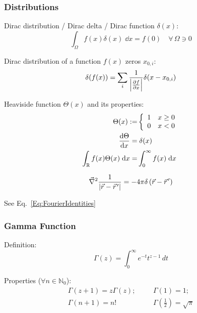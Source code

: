 		\subsubsection{Distributions}
			\noindent
			Dirac distribution / Dirac delta / Dirac function $\delta(x)$:
			\begin{equation}
				\int_\Omega f(x)\delta(x)\;\dd x = f(0)\quad\forall\, \Omega\ni 0
			\end{equation}

			\noindent
			Dirac distribution of a function $f(x)$ zeros $x_{0,i}$:
			\begin{equation}
				\delta(f(x)) = \sum_i \frac{1}{\abs{\pdv{f}{x}(x_{0,i})}}\delta(x-x_{0,i})
			\end{equation}

			\noindent
			Heaviside function $\Theta(x)$ and its properties:
			\begin{equation}
				\begin{aligned}
					\Theta(x) :=& \left\{\begin{array}{ll}
						1 & x\ge 0 \\
						0 & x<0 \\
						\end{array}\right. \\
						\dv{\Theta}{x}(x) =&\; \delta(x) \\
					\int_{\mathbb{R}} f(x)\Theta(x)\;\dd x =& \int_{0}^{\infty} f(x)\;\dd x
				\end{aligned}
			\end{equation}

			\begin{equation}
				\Nabla^2\frac{1}{\abs{\vec{r} - \pvec{r}'}} = -4\pi\delta\left(\vec{r} - \pvec{r}'\right)
			\end{equation}

			\noindent
			See Eq.~\ref{Eq:FourierIdentities}

		\subsubsection{Gamma Function}
			\noindent
			Definition:
			\begin{equation}
				\Gamma(z)=\int_0^{\infty}e^{-t}t^{z-1}\,dt
			\end{equation}

			\noindent
			Properties ($\forall n\in\mathbb{N}_0$):
			\begin{equation}
				\begin{array}{cc}
					\Gamma(z+1)=z\Gamma(z);
					&\hspace{20pt} \Gamma\left(1 \right)=1; \\
					\Gamma(n+1) = n!
					&\hspace{20pt} \Gamma\left(\frac{1}{2} \right)=\sqrt{\pi} \\
				\end{array}
			\end{equation}

